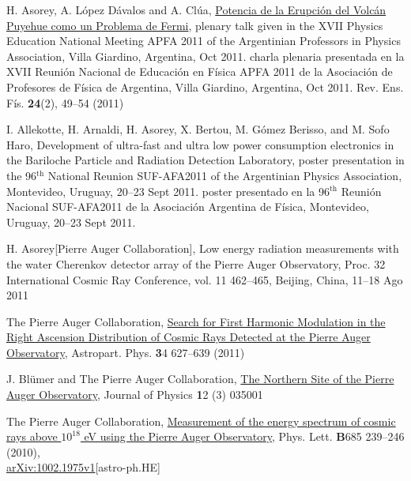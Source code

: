 \begin{etaremune}
\item {}H. Asorey, A. López Dávalos and A. Clúa, \href{https://dialnet.unirioja.es/servlet/articulo?codigo=4026852}{{Potencia de la Erupción del Volcán Puyehue como un Problema de Fermi}}, \ifeng plenary talk given in the XVII Physics Education National Meeting APFA 2011 of the Argentinian Professors in Physics Association, Villa Giardino, Argentina, Oct 2011. \else charla plenaria presentada en la XVII Reunión Nacional de Educación en Física APFA 2011 de la Asociación de Profesores de Física de Argentina, Villa Giardino, Argentina, Oct 2011. \fi Rev. Ens. Fís. {\textbf{24}}(2), 49--54 (2011)

\item {}I. Allekotte, H. Arnaldi, H. Asorey, X. Bertou, M. Gómez Berisso, and M. Sofo Haro, {{Development of ultra-fast and ultra low power consumption electronics in the Bariloche Particle and Radiation Detection Laboratory}},
\ifeng
poster presentation in the 96$^{\mathrm{th}}$ National Reunion SUF-AFA2011 of the Argentinian Physics Association, Montevideo, Uruguay, 20--23 Sept 2011.
\else
poster presentado en la 96$^{\mathrm{th}}$ Reunión Nacional SUF-AFA2011 de la Asociación Argentina de Física, Montevideo, Uruguay, 20--23 Sept 2011.
\fi

\item {}H. Asorey[Pierre Auger Collaboration], {{Low energy radiation
measurements with the water Cherenkov detector array of the Pierre Auger
Observatory}}, \en Proc.
32 International Cosmic Ray Conference, vol.
11
462--465, Beijing, China, 11--18 Ago 2011

\item {}The Pierre Auger Collaboration,
\href{http://dx.doi.org/10.1016/j.astropartphys.2010.12.007}{{Search for
First Harmonic Modulation in the Right Ascension Distribution of Cosmic Rays
Detected at the Pierre Auger Observatory}}, Astropart.
Phys. {\textbf 34} 627--639
(2011)

\item {}J. Blümer and The Pierre Auger Collaboration,
\href{http://dx.doi.org/10.1088/1367-2630/12/3/035001}{{The Northern Site
of the Pierre Auger Observatory}}, Journal of Physics {\textbf 12} (3) 035001

\item {}The Pierre Auger Collaboration,
\href{http://dx.doi.org/10.1016/j.physletb.2010.02.013}{{Measurement of
the energy spectrum of cosmic rays above $10^{18}$ eV using the Pierre Auger
Observatory}}, Phys.
Lett. {\textbf B685} 239--246 (2010),\\
\href{http://arxiv.org/abs/1002.1975}{arXiv:1002.1975v1}[astro-ph.HE]


\end{etaremune}
